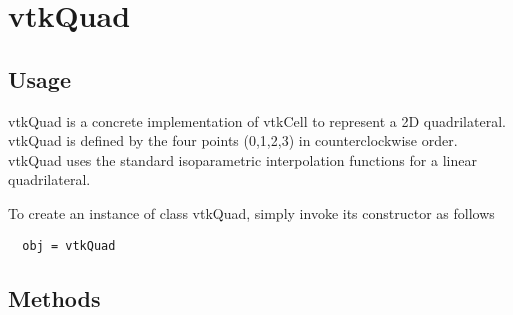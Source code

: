 \section{vtkQuad}

\subsection{Usage}

 vtkQuad is a concrete implementation of vtkCell to represent a 2D
 quadrilateral. vtkQuad is defined by the four points (0,1,2,3) in
 counterclockwise order. vtkQuad uses the standard isoparametric
 interpolation functions for a linear quadrilateral.

To create an instance of class vtkQuad, simply
invoke its constructor as follows
\begin{verbatim}
  obj = vtkQuad
\end{verbatim}
\subsection{Methods}

